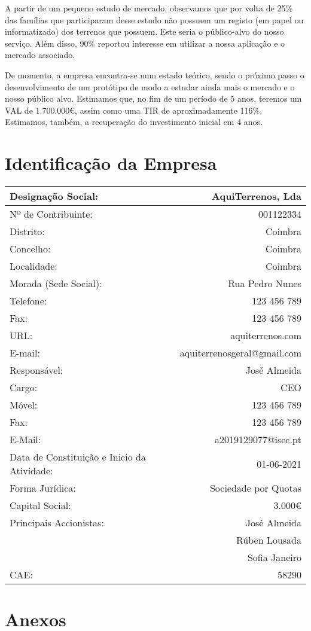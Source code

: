 \documentclass[11pt]{article}
\begin{document}
	A partir de um pequeno estudo de mercado, observamos que por volta de 25\% das famílias que participaram desse estudo não possuem um registo (em papel ou informatizado) dos terrenos que possuem. Este seria o público-alvo do nosso serviço. Além disso, 90\% reportou interesse em utilizar a nossa aplicação e o mercado associado.
	
	De momento, a empresa encontra-se num estado teórico, sendo o próximo passo o desenvolvimento de um protótipo de modo a estudar ainda mais o mercado e o nosso público alvo. Estimamos que, no fim de um período de 5 anos, teremos um VAL de 1.700.000€, assim como uma TIR de aproximadamente 116\%. Estimamos, também, a recuperação do investimento inicial em 4 anos.
	
	\pagebreak
	
	\large
	\section{Identificação da Empresa}
	
	\normalsize
	
	\begin{center}
		\begin{tabular}{ | l | r | }
			\hline
			Designação Social: & AquiTerrenos, Lda \\
			\hline
			Nº de Contribuinte: & 001122334 \\
			\hline 
			Distrito: & Coimbra \\
			\hline   
			Concelho: & Coimbra \\
			\hline   
			Localidade: & Coimbra \\
			\hline   
			Morada (Sede Social): & Rua Pedro Nunes \\
			\hline   
			Telefone: & 123 456 789 \\
			\hline 
			Fax: & 123 456 789 \\
			\hline 
			URL: & aquiterrenos.com \\
			\hline
			E-mail: & aquiterrenosgeral@gmail.com \\
			\hline 
			Responsável: & José Almeida \\
			\hline 
			Cargo: & CEO \\ 
			\hline
			Móvel: & 123 456 789 \\
			\hline 
			Fax: & 123 456 789 \\
			\hline 
			E-Mail: & a2019129077@isec.pt \\
			\hline 
			Data de Constituição e Inicio da Atividade: & 01-06-2021 \\
			\hline 
			Forma Jurídica: & Sociedade por Quotas \\
			\hline 
			Capital Social: & 3.000€ \\
			\hline
			Principais Accionistas: & José Almeida \\
			& Rúben Lousada  \\
			& Sofia Janeiro  \\
			\hline 
			CAE:  & 58290 \\
			\hline 
		\end{tabular}
	\end{center}

	\pagebreak

	\large
	\section{Anexos}

	\normalsize
	\listoffigures
\end{document}
